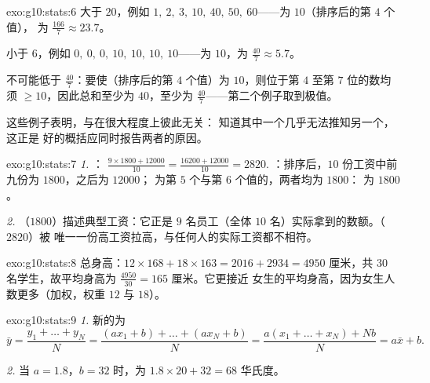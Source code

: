 \begin{solution}{exo:g10:stats:6}
大于 $20$，例如
$1,\ 2,\ 3,\ 10,\ 40,\ 50,\ 60$——为 $10$（排序后的第 $4$ 个值），
为 $\frac{166}{7} \approx 23.7$。

小于 $6$，例如
$0,\ 0,\ 0,\ 10,\ 10,\ 10,\ 10$——为 $10$，为
$\frac{40}{7} \approx 5.7$。

不可能低于 $\frac{40}{7}$：要使（排序后的第 $4$
个值）为 $10$，则位于第 $4$ 至第 $7$ 位的数均须
$\geq 10$，因此总和至少为 $40$，至少为
$\frac{40}{7}$——第二个例子取到极值。

这些例子表明，与在很大程度上彼此无关：
知道其中一个几乎无法推知另一个，这正是
好的概括应同时报告两者的原因。
\end{solution}

\begin{solution}{exo:g10:stats:7}
\emph{1.} ：
$\frac{9 \times 1800 + 12000}{10} = \frac{16200 + 12000}{10} = 2820$.
：排序后，$10$ 份工资中前九份为 $1800$，之后为 $12000$；
为第 $5$ 个与第 $6$ 个值的，两者均为 $1800$：
为 $1800$。

\emph{2.} （$1800$）描述典型工资：它正是
$9$ 名员工（全体 $10$ 名）实际拿到的数额。（$2820$）被
唯一一份高工资拉高，与任何人的实际工资都不相符。
\end{solution}

\begin{solution}{exo:g10:stats:8}
总身高：$12 \times 168 + 18 \times 163 = 2016 + 2934 = 4950$ 厘米，共
$30$ 名学生，故平均身高为 $\frac{4950}{30} = 165$ 厘米。它更接近
女生的平均身高，因为女生人数更多（加权，权重
$12$ 与 $18$）。
\end{solution}

\begin{solution}{exo:g10:stats:9}
\emph{1.} 新的为
\[
\bar y = \frac{y_1 + \dots + y_N}{N}
= \frac{(a x_1 + b) + \dots + (a x_N + b)}{N}
= \frac{a(x_1 + \dots + x_N) + Nb}{N}
= a \bar x + b .
\]

\emph{2.} 当 $a = 1.8$，$b = 32$ 时，为
$1.8 \times 20 + 32 = 68$ 华氏度。
\end{solution}

